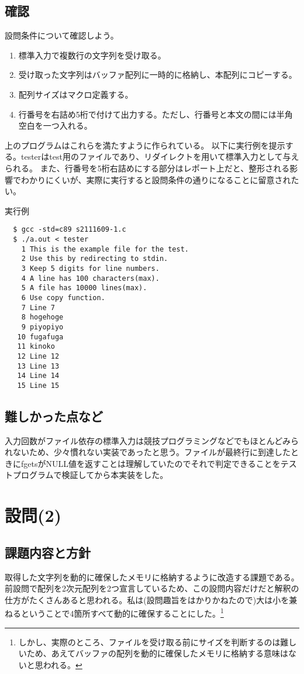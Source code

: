 \documentclass[dvipdfmx,12pt,a4j]{jarticle}
\begin{document}
\subsection{確認}
設問条件について確認しよう。
\begin{enumerate}
  \item 標準入力で複数行の文字列を受け取る。
  \item 受け取った文字列はバッファ配列に一時的に格納し、本配列にコピーする。
  \item 配列サイズはマクロ定義する。
  \item 行番号を右詰め5桁で付けて出力する。ただし、行番号と本文の間には半角空白を一つ入れる。
\end{enumerate}
上のプログラムはこれらを満たすように作られている。
以下に実行例を提示する。testerはtest用のファイルであり、リダイレクトを用いて標準入力として与えられる。
また、行番号を5桁右詰めにする部分はレポート上だと、整形される影響でわかりにくいが、実際に実行すると設問条件の通りになることに留意されたい。
\begin{itembox}[l]{実行例}
\begin{verbatim}
  $ gcc -std=c89 s2111609-1.c 
  $ ./a.out < tester
    1 This is the example file for the test.
    2 Use this by redirecting to stdin.
    3 Keep 5 digits for line numbers.
    4 A line has 100 characters(max).
    5 A file has 10000 lines(max).
    6 Use copy function.
    7 Line 7
    8 hogehoge
    9 piyopiyo
   10 fugafuga
   11 kinoko
   12 Line 12
   13 Line 13
   14 Line 14
   15 Line 15

\end{verbatim}
\end{itembox}

\subsection{難しかった点など}
入力回数がファイル依存の標準入力は競技プログラミングなどでもほとんどみられないため、少々慣れない実装であったと思う。ファイルが最終行に到達したときにfgetsがNULL値を返すことは理解していたのでそれで判定できることをテストプログラムで検証してから本実装をした。

\section{設問(2)}
\subsection{課題内容と方針}
取得した文字列を動的に確保したメモリに格納するように改造する課題である。前設問で配列を2次元配列を2つ宣言しているため、この設問内容だけだと解釈の仕方がたくさんあると思われる。私は(設問趣旨をはかりかねたので)大は小を兼ねるということで4箇所すべて動的に確保することにした。\footnote{しかし、実際のところ、ファイルを受け取る前にサイズを判断するのは難しいため、あえてバッファの配列を動的に確保したメモリに格納する意味はないと思われる。}
\end{document}
